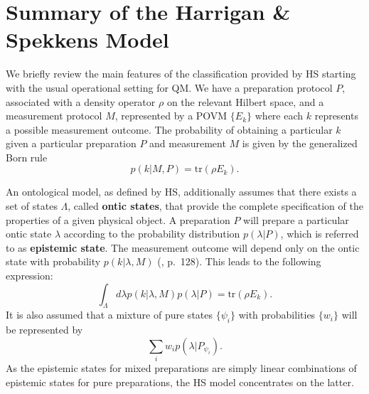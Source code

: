 \documentclass[twocolumn,prl,floatfix,superscriptaddress]{revtex4-2}
\begin{document}
\section{Summary of the Harrigan \& Spekkens Model}

We briefly review the main features of the classification provided by HS starting with the usual operational setting for QM. We have a preparation protocol $P$, associated with a density operator $\rho$ on the relevant Hilbert space, and a measurement protocol $M$, represented by a POVM $\{ E_k\}$ where each $k$ represents a possible measurement outcome. The probability of obtaining a particular $k$ given a particular preparation $P$ and measurement $M$ is given by the generalized Born rule
\begin{equation}
	p(k|M, P)=\textrm{tr}(\rho E_k).
\end{equation}

An ontological model, as defined by HS, additionally assumes that there exists a set of states $\Lambda$, called \textbf{ontic states}, that provide the complete specification of the properties of a given physical object. A preparation $P$ will prepare a particular ontic state $\lambda$ according to the probability distribution $p(\lambda | P)$, which is referred to as \textbf{epistemic state}. The measurement outcome will depend only on the ontic state with probability $p(k|\lambda, M)$ (\cite{Harrigan:2010}, p.\ 128). This leads to the following expression:
\begin{equation}
	\int_\Lambda d\lambda p(k|\lambda, M) p(\lambda| P)= \textrm{tr}(\rho E_k).
\end{equation}
It is also assumed that a mixture of pure states $\{ \psi_i \}$ with probabilities $\{ w_i \}$ will be represented by
\begin{equation}\label{epistemic_mixing}
	\sum_i  w_i p(\lambda| P_{\psi_i}).
\end{equation}
As the epistemic states for mixed preparations are simply linear combinations of epistemic states for pure preparations, the HS model concentrates on the latter.
\end{document}
